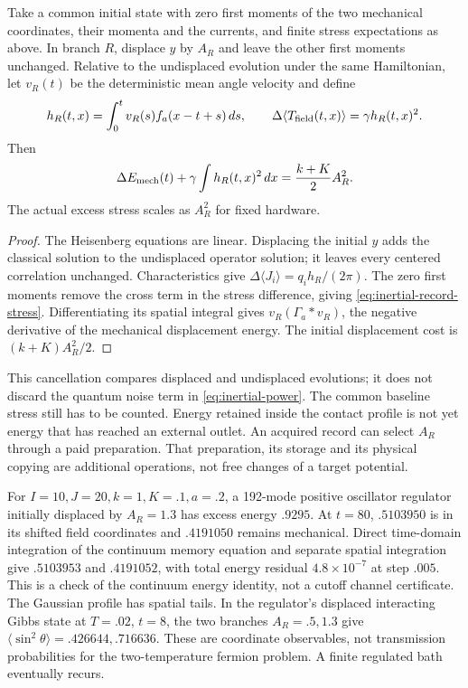 \begin{proposition}
\label{prop:inertial-record-source}
Take a common initial state with zero first moments of the two
mechanical coordinates, their momenta and the currents, and finite
stress expectations as above. In branch $R$, displace $y$ by $A_R$
and leave the other first moments unchanged. Relative to the
undisplaced evolution under the same Hamiltonian, let $v_R(t)$ be
the deterministic mean angle velocity and define
\begin{equation}\label{eq:inertial-record-stress}
 h_R(t,x)=\int_0^t v_R(s)f_a(x-t+s)\,ds,
 \qquad \Delta\langle T_{\rm field}(t,x)\rangle
       =\gamma h_R(t,x)^2.
\end{equation}
Then
\begin{equation}\label{eq:inertial-record-energy}
 \Delta E_{\rm mech}(t)+\gamma\int h_R(t,x)^2\,dx
             =\frac{k+K}{2}A_R^2.
\end{equation}
The actual excess stress scales as $A_R^2$ for fixed hardware.
\end{proposition}
\begin{proof}
The Heisenberg equations are linear. Displacing the initial $y$ adds
the classical solution to the undisplaced operator solution; it leaves
every centered correlation unchanged. Characteristics give
$\Delta\langle J_i\rangle=q_i h_R/(2\pi)$. The zero first moments
remove the cross term in the stress difference, giving
\eqref{eq:inertial-record-stress}. Differentiating its spatial integral
gives $v_R(\Gamma_a*v_R)$, the negative derivative of the mechanical
displacement energy. The initial displacement cost is
$(k+K)A_R^2/2$.
\end{proof}

This cancellation compares displaced and undisplaced evolutions; it
does not discard the quantum noise term in \eqref{eq:inertial-power}.
The common baseline stress still has to be counted. Energy retained
inside the contact profile is not yet energy that has reached an
external outlet. An acquired record can select $A_R$ through a paid
preparation. That preparation, its storage and its physical copying
are additional operations, not free changes of a target potential.

For $I=10,J=20,k=1,K=.1,a=.2$, a 192-mode positive oscillator
regulator initially displaced by $A_R=1.3$ has excess energy $.9295$.
At $t=80$, $.5103950$ is in its shifted field coordinates and
$.4191050$ remains mechanical. Direct time-domain integration of the
continuum memory equation and separate spatial integration give
$.5103953$ and $.4191052$, with total energy residual
$4.8\times10^{-7}$ at step $.005$. This is a check of the continuum
energy identity, not a cutoff channel certificate. The Gaussian profile
has spatial tails. In the regulator's displaced interacting Gibbs state
at $T=.02$, $t=8$, the two branches $A_R=.5,1.3$ give
$\langle\sin^2\theta\rangle=.426644,.716636$. These are coordinate
observables, not transmission probabilities for the two-temperature
fermion problem. A finite regulated bath eventually recurs.

